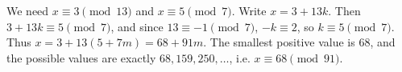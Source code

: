 We need $x\equiv3\pmod{13}$ and $x\equiv5\pmod7$. Write $x=3+13k$. Then $3+13k\equiv5\pmod7$, and since $13\equiv-1\pmod7$, $-k\equiv2$, so $k\equiv5\pmod7$. Thus $x=3+13(5+7m)=68+91m$. The smallest positive value is $\boxed{68}$, and the possible values are exactly $68,159,250,\dots$, i.e. $x\equiv68\pmod{91}$.
